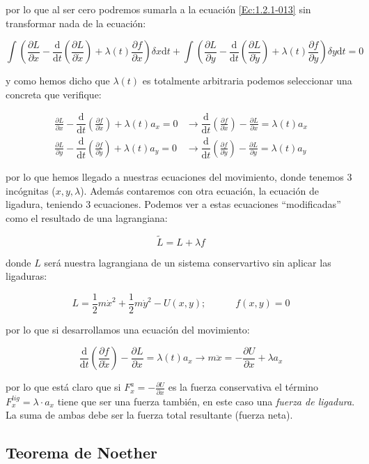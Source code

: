 \documentclass[12pt,a4paper]{book}
\newcommand{\parentesis}[1]{\left( #1  \right)}
\newcommand{\parciales}[2]{\frac{\partial #1}{\partial #2}}
\newcommand{\D}{\mathrm{d}}
\newcommand{\tquad}{\quad \quad \quad}
\begin{document}
por lo que al ser cero podremos sumarla a la ecuación \ref{Ec:1.2.1-013} sin transformar nada de la ecuación:

$$ \int \parentesis{\parciales{L}{x} - \dfrac{\D}{\D t} \parentesis{\parciales{L}{\dot{x}}} + \lambda(t) \parciales{f}{x}} \delta x \D t + \int \parentesis{\parciales{L}{y} - \dfrac{\D}{\D t} \parentesis{\parciales{L}{\dot{y}}} + \lambda(t) \parciales{f}{y}} \delta y \D t = 0 $$

y como hemos dicho que $\lambda(t)$ es totalmente arbitraria podemos seleccionar una concreta que verifique:

\begin{align}
\parciales{L}{x} - \dfrac{\D}{\D t} \parentesis{\parciales{f}{\dot{x}}} + \lambda(t) a_x = 0 & \longrightarrow   \dfrac{\D}{\D t} \parentesis{\parciales{f}{\dot{x}}} - \parciales{L}{x} = \lambda(t) a_x   \\
\parciales{L}{y} - \dfrac{\D}{\D t} \parentesis{\parciales{f}{\dot{y}}} + \lambda(t) a_y = 0 & \longrightarrow  \dfrac{\D}{\D t} \parentesis{\parciales{f}{\dot{y}}} - \parciales{L}{y} = \lambda(t) a_y
\end{align}

por lo que hemos llegado a nuestras ecuaciones del movimiento, donde tenemos 3 incógnitas ($x,y,\lambda$). Además contaremos con otra ecuación, la ecuación de ligadura, teniendo 3 ecuaciones. Podemos ver a estas ecuaciones ``modificadas'' como el resultado de una lagrangiana:

$$ \widetilde{L} = L + \lambda f $$

donde $L$ será nuestra lagrangiana de un sistema conservartivo sin aplicar las ligaduras:

\begin{equation}
L = \frac{1}{2} m \dot{x}^2 + \frac{1}{2} m \dot{y}^2 - U(x,y); \tquad f(x,y)=0
\end{equation}

por lo que si desarrollamos una ecuación del movimiento:

$$\dfrac{\D}{\D t} \parentesis{\parciales{f}{\dot{x}}} - \parciales{L}{x} = \lambda(t) a_x  \longrightarrow m \ddot{x} = - \parciales{U}{x} + \lambda a_x $$

por lo que está claro que si $F_x^a = -\parciales{U}{x}$ es la fuerza conservativa el término $F_x^{lig} = \lambda \cdot a_x$ tiene que ser una fuerza también, en este caso una \textit{fuerza de ligadura}. La suma de ambas debe ser la fuerza total resultante (fuerza neta).


\subsection{Teorema de Noether}
\end{document}
